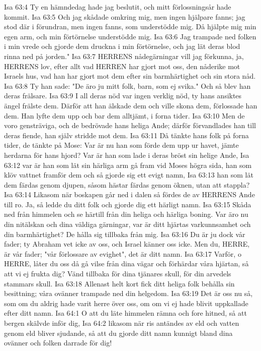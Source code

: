 Isa 63:4  Ty en hämndedag hade jag beslutit, och mitt förlossningsår hade kommit.
Isa 63:5  Och jag skådade omkring mig, men ingen hjälpare fanns; jag stod där i förundran, men ingen fanns, som understödde mig. Då hjälpte mig min egen arm, och min förtörnelse understödde mig.
Isa 63:6  Jag trampade ned folken i min vrede och gjorde dem druckna i min förtörnelse, och jag lät deras blod rinna ned på jorden."
Isa 63:7  HERRENS nådegärningar vill jag förkunna, ja, HERRENS lov, efter allt vad HERREN har gjort mot oss, den nåderike mot Israels hus, vad han har gjort mot dem efter sin barmhärtighet och sin stora nåd.
Isa 63:8  Ty han sade: "De äro ju mitt folk, barn, som ej svika." Och så blev han deras frälsare.
Isa 63:9  I all deras nöd var ingen verklig nöd, ty hans ansiktes ängel frälste dem. Därför att han älskade dem och ville skona dem, förlossade han dem. Han lyfte dem upp och bar dem alltjämt, i forna tider.
Isa 63:10  Men de voro gensträviga, och de bedrövade hans heliga Ande; därför förvandlades han till deras fiende, han själv stridde mot dem.
Isa 63:11  Då tänkte hans folk på forna tider, de tänkte på Mose: Var är nu han som förde dem upp ur havet, jämte herdarna för hans hjord? Var är han som lade i deras bröst sin helige Ande,
Isa 63:12  var är han som lät sin härliga arm gå fram vid Moses högra sida, han som klöv vattnet framför dem och så gjorde sig ett evigt namn,
Isa 63:13  han som lät dem färdas genom djupen, såsom hästar färdas genom öknen, utan att stappla?
Isa 63:14  Likasom när boskapen går ned i dalen så fördes de av HERRENS Ande till ro. Ja, så ledde du ditt folk och gjorde dig ett härligt namn.
Isa 63:15  Skåda ned från himmelen och se härtill från din heliga och härliga boning. Var äro nu din nitälskan och dina väldiga gärningar, var är ditt hjärtas varkunnsamhet och din barmhärtighet? De hålla sig tillbaka från mig.
Isa 63:16  Du är ju dock vår fader; ty Abraham vet icke av oss, och Israel känner oss icke. Men du, HERRE, är vår fader; "vår förlossare av evighet", det är ditt namn.
Isa 63:17  Varför, o HERRE, låter du oss då gå vilse från dina vägar och förhärdar våra hjärtan, så att vi ej frukta dig? Vänd tillbaka för dina tjänares skull, för din arvedels stammars skull.
Isa 63:18  Allenast helt kort fick ditt heliga folk behålla sin besittning; våra ovänner trampade ned din helgedom.
Isa 63:19  Det är oss nu så, som om du aldrig hade varit herre över oss, om om vi ej hade blivit uppkallade efter ditt namn.
Isa 64:1  O att du läte himmelen rämna och fore hitned, så att bergen skälvde inför dig,
Isa 64:2  likasom när ris antändes av eld och vatten genom eld bliver sjudande, så att du gjorde ditt namn kunnigt bland dina ovänner och folken darrade för dig!
